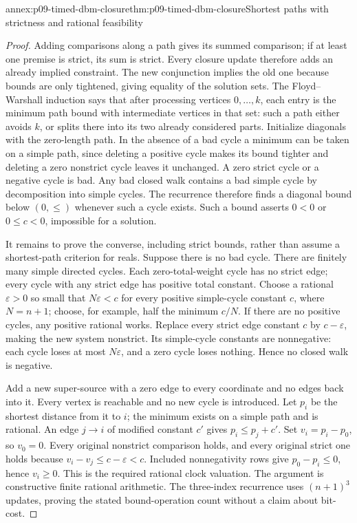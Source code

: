 \begin{annexitem}{annex:p09-timed-dbm-closure}{thm:p09-timed-dbm-closure}{Shortest paths with strictness and rational feasibility}
\begin{proof}
Adding comparisons along a path gives its summed comparison; if at least
one premise is strict, its sum is strict. Every closure update therefore
adds an already implied constraint. The new conjunction implies the old
one because bounds are only tightened, giving equality of the solution
sets. The Floyd--Warshall induction says that after processing vertices
\(0,\ldots,k\), each entry is the minimum path bound with intermediate
vertices in that set: such a path either avoids \(k\), or splits there
into its two already considered parts. Initialize diagonals with the
zero-length path. In the absence of a bad cycle a minimum can be taken
on a simple path, since deleting a positive cycle makes its bound tighter
and deleting a zero nonstrict cycle leaves it unchanged. A zero strict
cycle or a negative cycle is bad. Any bad closed walk contains a bad
simple cycle by decomposition into simple cycles. The recurrence therefore
finds a diagonal bound below \((0,\leq)\) whenever such a cycle exists.
Such a bound asserts \(0<0\) or \(0\leq c<0\), impossible for a solution.

It remains to prove the converse, including strict bounds, rather than
assume a shortest-path criterion for reals. Suppose there is no bad cycle.
There are finitely many simple directed cycles. Each zero-total-weight
cycle has no strict edge; every cycle with any strict edge has positive
total constant. Choose a rational \(\varepsilon>0\) so small that
\(N\varepsilon<c\) for every positive simple-cycle constant \(c\),
where \(N=n+1\); choose, for example, half the minimum \(c/N\).
If there are no positive cycles, any positive rational works. Replace
every strict edge constant \(c\) by \(c-\varepsilon\), making the new
system nonstrict. Its simple-cycle constants are nonnegative: each cycle
loses at most \(N\varepsilon\), and a zero cycle loses nothing. Hence
no closed walk is negative.

Add a new super-source with a zero edge to every coordinate and no edges
back into it. Every vertex is reachable and no new cycle is introduced.
Let \(p_i\) be the shortest distance from it to \(i\); the minimum exists
on a simple path and is rational. An edge \(j\to i\) of modified constant
\(c'\) gives \(p_i\leq p_j+c'\). Set \(v_i=p_i-p_0\), so \(v_0=0\).
Every original nonstrict comparison holds, and every original strict one
holds because \(v_i-v_j\leq c-\varepsilon<c\). Included nonnegativity
rows give \(p_0-p_i\leq0\), hence \(v_i\geq0\). This is the required
rational clock valuation. The argument is constructive finite rational
arithmetic. The three-index recurrence uses \((n+1)^3\) updates, proving
the stated bound-operation count without a claim about bit-cost.
\end{proof}
\end{annexitem}

